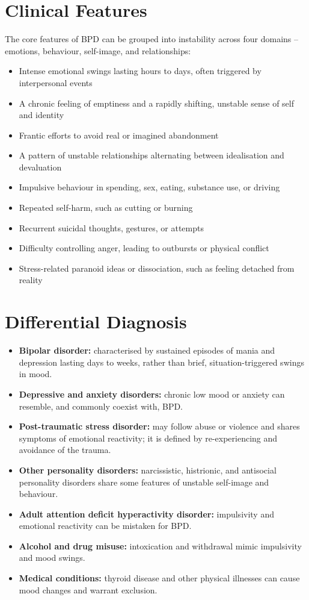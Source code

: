 \section*{Clinical Features}
The core features of BPD can be grouped into instability across four domains -- emotions, behaviour, self-image, and relationships:
\begin{itemize}
    \item Intense emotional swings lasting hours to days, often triggered by interpersonal events
    \item A chronic feeling of emptiness and a rapidly shifting, unstable sense of self and identity
    \item Frantic efforts to avoid real or imagined abandonment
    \item A pattern of unstable relationships alternating between idealisation and devaluation
    \item Impulsive behaviour in spending, sex, eating, substance use, or driving
    \item Repeated self-harm, such as cutting or burning
    \item Recurrent suicidal thoughts, gestures, or attempts
    \item Difficulty controlling anger, leading to outbursts or physical conflict
    \item Stress-related paranoid ideas or dissociation, such as feeling detached from reality
\end{itemize}

\section*{Differential Diagnosis}
\begin{itemize}
    \item \textbf{Bipolar disorder:} characterised by sustained episodes of mania and depression lasting days to weeks, rather than brief, situation-triggered swings in mood.
    \item \textbf{Depressive and anxiety disorders:} chronic low mood or anxiety can resemble, and commonly coexist with, BPD.
    \item \textbf{Post-traumatic stress disorder:} may follow abuse or violence and shares symptoms of emotional reactivity; it is defined by re-experiencing and avoidance of the trauma.
    \item \textbf{Other personality disorders:} narcissistic, histrionic, and antisocial personality disorders share some features of unstable self-image and behaviour.
    \item \textbf{Adult attention deficit hyperactivity disorder:} impulsivity and emotional reactivity can be mistaken for BPD.
    \item \textbf{Alcohol and drug misuse:} intoxication and withdrawal mimic impulsivity and mood swings.
    \item \textbf{Medical conditions:} thyroid disease and other physical illnesses can cause mood changes and warrant exclusion.
\end{itemize}

